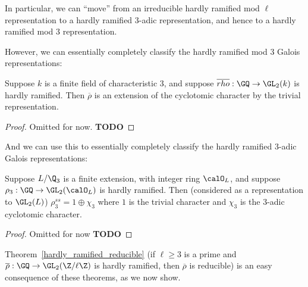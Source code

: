 In particular, we can ``move'' from an irreducible hardly ramified mod $\ell$ representation
to a hardly ramified 3-adic representation, and hence to a hardly ramified mod 3 representation.

However, we can essentially completely classify the hardly ramified mod 3 Galois representations:

\begin{theorem}
  \label{hardly_ramified_mod3_reducible}
  \leanok
  Suppose $k$ is a finite field of characteristic 3, and suppose
  $\overline{rho}:\GQ\to\GL_2(k)$ is hardly ramified. Then $\overline{\rho}$ is an extension
  of the cyclotomic character by the trivial representation.
\end{theorem}
\begin{proof}
  Omitted for now. {\bf TODO}
\end{proof}

And we can use this to essentially completely classify the hardly ramified 3-adic Galois
representations:

\begin{theorem}
  \label{hardly_ramified_3adic_reducible}
  \leanok
  Suppose $L/\Q_3$ is a finite extension, with integer ring $\calO_L$, and suppose
  $\rho_3:\GQ\to\GL_2(\calO_L)$ is hardly ramified. Then (considered as a representation
  to $\GL_2(L)$) $\rho_3^{ss}=1\oplus\chi_3$
  where $1$ is the trivial character and $\chi_3$ is the 3-adic cyclotomic character.
\end{theorem}
\begin{proof}
  Omitted for now {\bf TODO}
\end{proof}

Theorem~\ref{hardly_ramified_reducible} (if $\ell\geq 3$ is a prime and
$\overline{\rho}:\GQ\to\GL_2(\Z/\ell\Z)$ is hardly ramified,
then $\overline{\rho}$ is reducible) is an easy consequence of these theorems,
as we now show.

